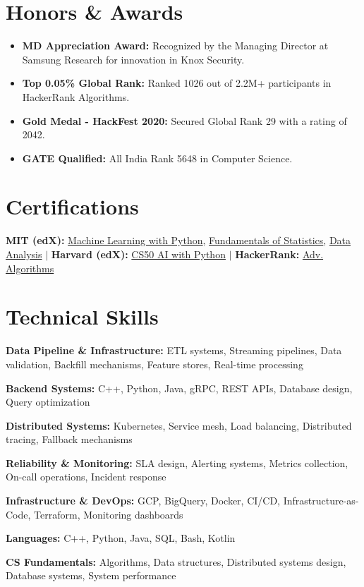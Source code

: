 \documentclass[10pt, letterpaper]{article}
\newcommand{\resumeItem}[1]{
  \item\small{
    {#1 \vspace{-2pt}}
  }
}
\newcommand{\resumeSubHeadingListStart}{\begin{itemize}[leftmargin=0.15in, label={}]}
\newcommand{\resumeSubHeadingListEnd}{\end{itemize}}
\begin{document}
\section{Honors \& Awards}
  \resumeSubHeadingListStart
    \resumeItem{\textbf{MD Appreciation Award:} Recognized by the Managing Director at Samsung Research for innovation in Knox Security.}
    \resumeItem{\textbf{Top 0.05\% Global Rank:} Ranked 1026 out of 2.2M+ participants in HackerRank Algorithms.}
    \resumeItem{\textbf{Gold Medal - HackFest 2020:} Secured Global Rank 29 with a rating of 2042.}
    \resumeItem{\textbf{GATE Qualified:} All India Rank 5648 in Computer Science.}
  \resumeSubHeadingListEnd

\section{Certifications}
  \small{
    \textbf{MIT (edX):} \href{https://courses.edx.org/certificates/bf4ea7cb34a742cea00c770801d1947d}{Machine Learning with Python}, \href{https://courses.edx.org/certificates/3c59035943454549990f2d2de7f49e9f}{Fundamentals of Statistics}, \href{https://courses.edx.org/certificates/bf4ea7cb34a742cea00c770801d1947d}{Data Analysis} $|$
    \textbf{Harvard (edX):} \href{https://cs50.harvard.edu/certificates/2b1773c1-473d-4a7b-89ae-460d23154126}{CS50 AI with Python} $|$
    \textbf{HackerRank:} \href{https://www.hackerrank.com/certificates/fc7b9af8aac8}{Adv. Algorithms}
  }

\section{Technical Skills}
 \begin{itemize}[leftmargin=0.12in, label={}]
    \small{\item{
     \textbf{Data Pipeline \& Infrastructure:} ETL systems, Streaming pipelines, Data validation, Backfill mechanisms, Feature stores, Real-time processing
    }}
    \small{\item{
     \textbf{Backend Systems:} C++, Python, Java, gRPC, REST APIs, Database design, Query optimization
    }}
    \small{\item{
     \textbf{Distributed Systems:} Kubernetes, Service mesh, Load balancing, Distributed tracing, Fallback mechanisms
    }}
    \small{\item{
     \textbf{Reliability \& Monitoring:} SLA design, Alerting systems, Metrics collection, On-call operations, Incident response
    }}
    \small{\item{
     \textbf{Infrastructure \& DevOps:} GCP, BigQuery, Docker, CI/CD, Infrastructure-as-Code, Terraform, Monitoring dashboards
    }}
    \small{\item{
     \textbf{Languages:} C++, Python, Java, SQL, Bash, Kotlin
    }}
    \small{\item{
     \textbf{CS Fundamentals:} Algorithms, Data structures, Distributed systems design, Database systems, System performance
    }}
 \end{itemize}
\end{document}
